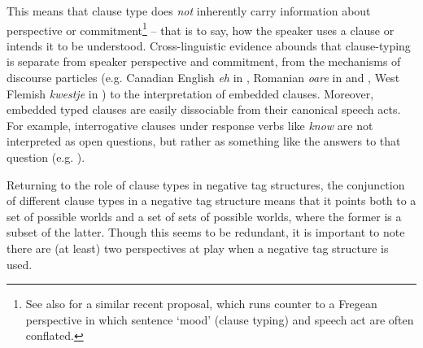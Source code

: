 \documentclass[output=paper,colorlinks,citecolor=brown]{langscibook}
\begin{document}
This means that clause type does \textit{not} inherently carry information about perspective or commitment\footnote{See also \citet{schmitz2021} for a similar recent proposal, which runs counter to a Fregean perspective in which sentence `mood' (clause typing) and speech act are often conflated.} -- that is to say, how the speaker uses a clause or intends it to be understood. Cross-linguistic evidence abounds that clause-typing is separate from speaker perspective and commitment, from the mechanisms of discourse particles (e.g. Canadian English \textit{eh} in , Romanian \textit{oare} in \citealt{conigzeg2012} and \citealt{farkas2022}, West Flemish \textit{kwestje} in \citealt{woodshaegesubm}) to the interpretation of embedded clauses. Moreover, embedded typed clauses are easily dissociable from their canonical speech acts. For example, interrogative clauses under response verbs like \textit{know} are not interpreted as open questions, but rather as something like the answers to that question (e.g. \citealt{lahiri2002, uegaki2015}).

Returning to the role of clause types in negative tag structures, the conjunction of different clause types in a negative tag structure means that it points both to a set of possible worlds and a set of sets of possible worlds, where the former is a subset of the latter. Though this seems to be redundant, it is important to note there are (at least) two perspectives at play when a negative tag structure is used. 
\end{document}
